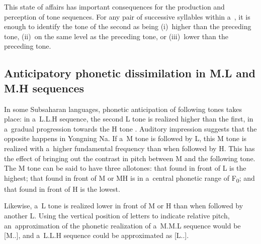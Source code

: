 This state of affairs has important consequences for the production and perception of tone sequences. For any pair of successive syllables within a~, it is enough to identify
the tone of the second as being (i)~higher than the preceding tone, (ii)~on the same level as the preceding
tone, or (iii)~lower than the preceding tone.


\subsection[Anticipatory dissimilation in M.L and M.H sequences]{Anticipatory phonetic dissimilation in M.L and M.H sequences}
\label{sec:tonalcoarticulationanticipatoryphoneticdissimilationinmlandmhsequences}

In some Subsaharan languages, phonetic anticipation of following tones takes place: in a~L.L.H sequence, the
second L tone is realized higher than the first, in a~gradual progression towards the H
tone \citep[216]{creissels1994}. Auditory impression suggests that the opposite happens in Yongning Na. If a~M tone is followed by L, this M tone is
realized with a~higher fundamental frequency than when followed by H. This has the effect of
bringing out the contrast in pitch between M and the following tone. The M tone can be said to have
three allotones: that found in front of L is the highest; that found in front of M or MH is in a~central
phonetic range of F\textsubscript{0}; and that found in front of H is the
lowest.

Likewise, a~L tone is realized lower in front of M or H than when followed by another L. Using the
vertical position of letters to indicate relative pitch, an~approximation of the phonetic
realization of a~M.M.L sequence would be [M..], and a~L.L.H sequence could be approximated as
[L..].

